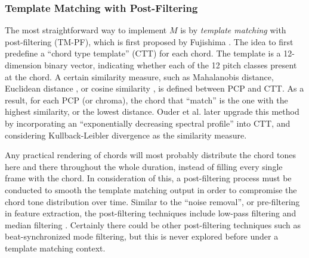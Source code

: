 \subsubsection{Template Matching with Post-Filtering}
The most straightforward way to implement $M$ is by {\it template matching} with post-filtering (TM-PF), which is first proposed by Fujishima \cite{fujishima1999realtime}. The idea to first predefine a ``chord type template'' (CTT) for each chord. The template is a 12-dimension binary vector, indicating whether each of the 12 pitch classes present at the chord. A certain similarity measure, such as Mahalanobis distance\cite{reinhard2008enhancing}, Euclidean distance \cite{zenz2007automatic}, or cosine similarity \cite{harte2005automatic}, is defined between PCP and CTT. As a result, for each PCP (or chroma), the chord that ``match'' is the one with the highest similarity, or the lowest distance. Ouder et al. \cite{oudre2009template} later upgrade this method by incorporating an ``exponentially decreasing spectral profile'' \cite{gomez2006tonal_a} into CTT, and considering Kullback-Leibler divergence \cite{kullback1951information} as the similarity measure.

Any practical rendering of chords will most probably distribute the chord tones here and there throughout the whole duration, instead of filling every single frame with the chord. In consideration of this, a post-filtering process must be conducted to smooth the template matching output in order to compromise the chord tone distribution over time. Similar to the ``noise removal'', or pre-filtering \cite{cho2014improved} in feature extraction, the post-filtering \cite{cho2014improved} techniques include low-pass filtering \cite{oudre2009template} and median filtering \cite{harte2005automatic,humphrey2012rethinking}. Certainly there could be other post-filtering techniques such as beat-synchronized mode filtering, but this is never explored before under a template matching context.


